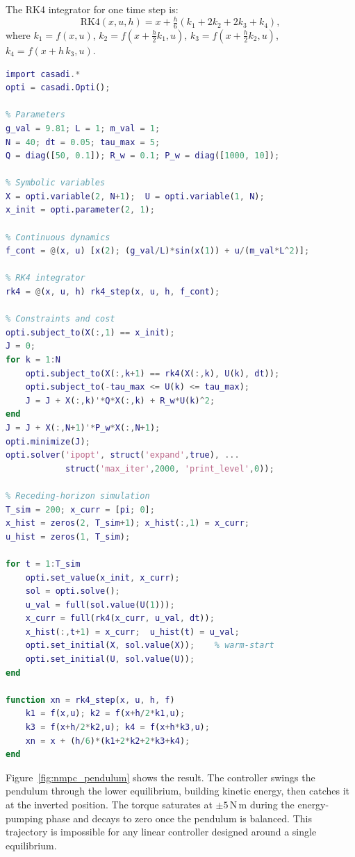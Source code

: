 The RK4 integrator for one time step is:
\[
\text{RK4}(x, u, h) = x + \tfrac{h}{6}(k_1 + 2k_2 + 2k_3 + k_4),
\]
where $k_1 = f(x, u)$, $k_2 = f(x + \tfrac{h}{2}k_1, u)$, $k_3 = f(x + \tfrac{h}{2}k_2, u)$, $k_4 = f(x + h\,k_3, u)$.

\begin{lstlisting}[language=Matlab, caption={Pendulum swing-up NMPC using CasADi and IPOPT.}, label=lst:casadi_pendulum]
import casadi.*
opti = casadi.Opti();

% Parameters
g_val = 9.81; L = 1; m_val = 1;
N = 40; dt = 0.05; tau_max = 5;
Q = diag([50, 0.1]); R_w = 0.1; P_w = diag([1000, 10]);

% Symbolic variables
X = opti.variable(2, N+1);  U = opti.variable(1, N);
x_init = opti.parameter(2, 1);

% Continuous dynamics
f_cont = @(x, u) [x(2); (g_val/L)*sin(x(1)) + u/(m_val*L^2)];

% RK4 integrator
rk4 = @(x, u, h) rk4_step(x, u, h, f_cont);

% Constraints and cost
opti.subject_to(X(:,1) == x_init);
J = 0;
for k = 1:N
    opti.subject_to(X(:,k+1) == rk4(X(:,k), U(k), dt));
    opti.subject_to(-tau_max <= U(k) <= tau_max);
    J = J + X(:,k)'*Q*X(:,k) + R_w*U(k)^2;
end
J = J + X(:,N+1)'*P_w*X(:,N+1);
opti.minimize(J);
opti.solver('ipopt', struct('expand',true), ...
            struct('max_iter',2000, 'print_level',0));

% Receding-horizon simulation
T_sim = 200; x_curr = [pi; 0];
x_hist = zeros(2, T_sim+1); x_hist(:,1) = x_curr;
u_hist = zeros(1, T_sim);

for t = 1:T_sim
    opti.set_value(x_init, x_curr);
    sol = opti.solve();
    u_val = full(sol.value(U(1)));
    x_curr = full(rk4(x_curr, u_val, dt));
    x_hist(:,t+1) = x_curr;  u_hist(t) = u_val;
    opti.set_initial(X, sol.value(X));    % warm-start
    opti.set_initial(U, sol.value(U));
end

function xn = rk4_step(x, u, h, f)
    k1 = f(x,u); k2 = f(x+h/2*k1,u);
    k3 = f(x+h/2*k2,u); k4 = f(x+h*k3,u);
    xn = x + (h/6)*(k1+2*k2+2*k3+k4);
end
\end{lstlisting}

Figure~\ref{fig:nmpc_pendulum} shows the result. The controller swings the pendulum through the lower equilibrium, building kinetic energy, then catches it at the inverted position. The torque saturates at $\pm 5$\,N\,m during the energy-pumping phase and decays to zero once the pendulum is balanced. This trajectory is impossible for any linear controller designed around a single equilibrium.

